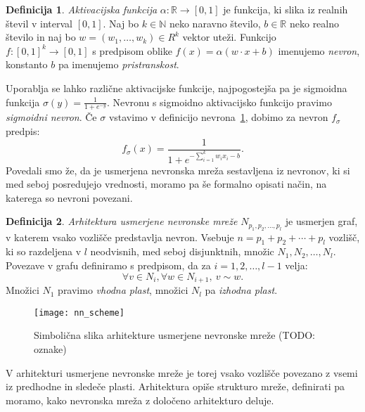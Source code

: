 \documentclass[12pt,a4paper,twoside]{article}
\theoremstyle{definition} %
\newtheorem{definicija}{Definicija}[section]
\theoremstyle{plain} %
\numberwithin{equation}{section}  %
\newcommand{\R}{\mathbb R}
\begin{document}
\begin{definicija}
\label{nevron}
	\emph{Aktivacijska funkcija} $\alpha: \R \rightarrow [0,1]$ je funkcija, ki slika iz realnih števil v interval $[0,1]$.
	Naj bo $k \in \mathbb{N}$ neko naravno število, $b \in \R$ neko realno število in naj bo $w=(w_1,\ldots,w_k) \in R^k$ vektor uteži.
	Funkcijo $f: [0,1]^k \rightarrow [0,1]$ s predpisom oblike $f(x) = \alpha(w\cdot x + b)$ imenujemo \emph{nevron}, konstanto $b$ pa imenujemo \emph{pristranskost}.
\end{definicija}

Uporablja se lahko različne aktivacijske funkcije, najpogostejša pa je sigmoidna funkcija $\sigma(y) = \frac{1}{1+e^{-y}}$. 
Nevronu s sigmoidno aktivacijsko funkcijo pravimo \emph{sigmoidni nevron}. Če $\sigma$ vstavimo v definicijo nevrona~\ref{nevron}, dobimo za nevron $f_{\sigma}$ predpis:
\[
f_{\sigma}(x)= \frac{1}{1+e^{-\sum_{i=1}^k w_i x_i - b}}.
\]
Povedali smo že, da je usmerjena nevronska mreža sestavljena iz nevronov, ki si med seboj posredujejo vrednosti, moramo pa še formalno opisati način, na katerega so nevroni povezani.

\begin{definicija}
\label{def:arhitektura}
	\emph{Arhitektura usmerjene nevronske mreže} $N_{p_1,p_2,\ldots,p_l}$ je usmerjen graf, v katerem vsako vozlišče predstavlja nevron. 
	Vsebuje $n= p_1+p_2+\cdots+p_l$ vozlišč, ki so razdeljena v $l$ neodvisnih, med seboj disjunktnih, množic $N_1, N_2, \ldots, N_l$. 
	Povezave v grafu definiramo s predpisom, da za $i=1,2,\ldots,l-1$ velja:
	\[
	\forall v \in N_i, \forall w \in N_{i+1},\ v \sim w.
	\]
	Množici $N_1$ pravimo \emph{vhodna plast}, množici $N_l$ pa \emph{izhodna plast}.
\end{definicija}

\begin{figure}[h!]
	\centering
	\texttt{[image: nn\_scheme]}
	\caption[Slika arhitekture usmerjene nevronske mreŽe]{Simbolična slika arhitekture usmerjene nevronske mreže (TODO: oznake)}
	\label{fig:arhitektura}
\end{figure}

V arhitekturi usmerjene nevronske mreže je torej vsako vozlišče povezano z vsemi iz predhodne in sledeče plasti.
Arhitektura opiše strukturo mreže, definirati pa moramo, kako nevronska mreža z določeno arhitekturo deluje.
\end{document}
